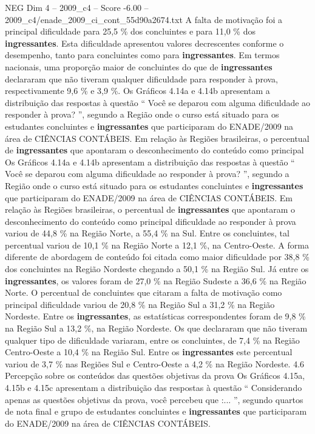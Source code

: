 \begin{textsample}{NEG Dim 4 – 2009\_c4 – Score -6.00 – 2009\_c4/enade\_2009\_ci\_cont\_55d90a2674.txt}
A falta de motivação foi a principal dificuldade para 25,5 \% dos concluintes e para 11,0 \% dos \textbf{ingressantes}.
Esta dificuldade apresentou valores decrescentes conforme o desempenho, tanto para concluintes como para \textbf{ingressantes}.
Em termos nacionais, uma proporção maior de concluintes do que de \textbf{ingressantes} declararam que não tiveram qualquer dificuldade para responder à prova, respectivamente 9,6 \% e 3,9 \%.
Os Gráficos 4.14a e 4.14b apresentam a distribuição das respostas à questão “ Você se deparou com alguma dificuldade ao responder à prova? ”, segundo a Região onde o curso está situado para os estudantes concluintes e \textbf{ingressantes} que participaram do ENADE/2009 na área de CIÊNCIAS CONTÁBEIS.
Em relação às Regiões brasileiras, o percentual de \textbf{ingressantes} que apontaram o desconhecimento do conteúdo como principal Os Gráficos 4.14a e 4.14b apresentam a distribuição das respostas à questão “ Você se deparou com alguma dificuldade ao responder à prova? ”, segundo a Região onde o curso está situado para os estudantes concluintes e \textbf{ingressantes} que participaram do ENADE/2009 na área de CIÊNCIAS CONTÁBEIS.
Em relação às Regiões brasileiras, o percentual de \textbf{ingressantes} que apontaram o desconhecimento do conteúdo como principal dificuldade ao responder à prova variou de 44,8 \% na Região Norte, a 55,4 \% na Sul.
Entre os concluintes, tal percentual variou de 10,1 \% na Região Norte a 12,1 \%, na Centro-Oeste.
A forma diferente de abordagem de conteúdo foi citada como maior dificuldade por 38,8 \% dos concluintes na Região Nordeste chegando a 50,1 \% na Região Sul.
Já entre os \textbf{ingressantes}, os valores foram de 27,0 \% na Região Sudeste a 36,6 \% na Região Norte.
O percentual de concluintes que citaram a falta de motivação como principal dificuldade variou de 20,8 \% na Região Sul a 31,2 \% na Região Nordeste.
Entre os \textbf{ingressantes}, as estatísticas correspondentes foram de 9,8 \% na Região Sul a 13,2 \%, na Região Nordeste.
Os que declararam que não tiveram qualquer tipo de dificuldade variaram, entre os concluintes, de 7,4 \% na Região Centro-Oeste a 10,4 \% na Região Sul.
Entre os \textbf{ingressantes} este percentual variou de 3,7 \% nas Regiões Sul e Centro-Oeste a 4,2 \% na Região Nordeste. 4.6 Percepção sobre os conteúdos das questões objetivas da prova Os Gráficos 4.15a, 4.15b e 4.15c apresentam a distribuição das respostas à questão “ Considerando apenas as questões objetivas da prova, você percebeu que :... ”, segundo quartos de nota final e grupo de estudantes concluintes e \textbf{ingressantes} que participaram do ENADE/2009 na área de CIÊNCIAS CONTÁBEIS.

\end{textsample}
